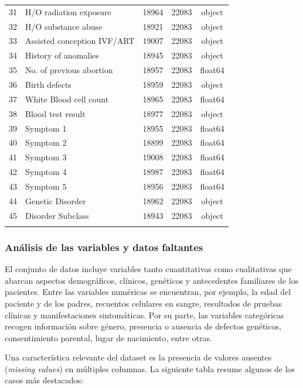 \documentclass[11pt,a4paper,spanish]{book}
\numberwithin{equation}{chapter}
\numberwithin{figure}{chapter}
\begin{document}
\begin{longtable}{|c|l|c|c|c|}
31 & H/O radiation exposure & 18964 & 22083 & object \\
32 & H/O substance abuse & 18921 & 22083 & object \\
33 & Assisted conception IVF/ART & 19007 & 22083 & object \\
34 & History of anomalies & 18945 & 22083 & object \\
35 & No. of previous abortion & 18957 & 22083 & float64 \\
36 & Birth defects & 18959 & 22083 & object \\
37 & White Blood cell count & 18965 & 22083 & float64 \\
38 & Blood test result & 18977 & 22083 & object \\
39 & Symptom 1 & 18955 & 22083 & float64 \\
40 & Symptom 2 & 18899 & 22083 & float64 \\
41 & Symptom 3 & 19008 & 22083 & float64 \\
42 & Symptom 4 & 18987 & 22083 & float64 \\
43 & Symptom 5 & 18956 & 22083 & float64 \\
44 & Genetic Disorder & 18962 & 22083 & object \\
45 & Disorder Subclass & 18943 & 22083 & object \\
\hline
\label{tab:resumen_datos}
\end{longtable}

\subsubsection*{Análisis de las variables y datos faltantes}

El conjunto de datos incluye variables tanto cuantitativas como cualitativas que abarcan aspectos demográficos, clínicos, genéticos y antecedentes familiares de los pacientes. Entre las variables numéricas se encuentran, por ejemplo, la edad del paciente y de los padres, recuentos celulares en sangre, resultados de pruebas clínicas y manifestaciones sintomáticas. Por su parte, las variables categóricas recogen información sobre género, presencia o ausencia de defectos genéticos, consentimiento parental, lugar de nacimiento, entre otras.

Una característica relevante del dataset es la presencia de valores ausentes (\textit{missing values}) en múltiples columnas. La siguiente tabla resume algunos de los casos más destacados:
\end{document}
